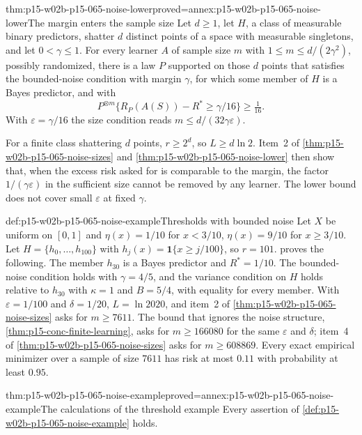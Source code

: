 \begin{hbcorollary}{thm:p15-w02b-p15-065-noise-lower}{proved=annex:p15-w02b-p15-065-noise-lower}{The margin enters the sample size}
Let \(d\geq1\), let \(H\), a class of measurable binary predictors,
shatter \(d\) distinct points of a space with measurable singletons, and
let \(0<\gamma\leq1\). For every learner \(A\)
of sample size \(m\) with \(1\leq m\leq d/(2\gamma^2)\), possibly
randomized, there is a law \(P\) supported on those \(d\) points that
satisfies the bounded-noise condition with margin \(\gamma\), for which
some member of \(H\) is a Bayes predictor, and with
\[
 P^{\otimes m}\{R_P(A(S))-R^{*}\geq\gamma/16\}\geq\tfrac1{16}.
\]
With \(\varepsilon=\gamma/16\) the size condition reads
\(m\leq d/(32\gamma\varepsilon)\).
\end{hbcorollary}

For a finite class shattering \(d\) points, \(r\geq2^d\), so
\(L\geq d\ln2\). Item~2 of \cref{thm:p15-w02b-p15-065-noise-sizes} and
\cref{thm:p15-w02b-p15-065-noise-lower} then show that, when the excess
risk asked for is comparable to the margin, the factor
\(1/(\gamma\varepsilon)\) in the sufficient size cannot be removed by any
learner. The lower bound does not cover small \(\varepsilon\) at fixed
\(\gamma\).

\begin{hbexample}{def:p15-w02b-p15-065-noise-example}{Thresholds with bounded noise}
Let \(X\) be uniform on \([0,1]\) and \(\eta(x)=1/10\) for \(x<3/10\),
\(\eta(x)=9/10\) for \(x\geq3/10\). Let \(H=\{h_0,\ldots,h_{100}\}\) with
\(h_j(x)=\mathbf1\{x\geq j/100\}\), so \(r=101\).
 proves the following. The member
\(h_{30}\) is a Bayes predictor and \(R^{*}=1/10\). The bounded-noise
condition holds with \(\gamma=4/5\), and the variance condition on \(H\)
holds relative to \(h_{30}\) with \(\kappa=1\) and \(B=5/4\), with equality
for every member. With \(\varepsilon=1/100\) and \(\delta=1/20\),
\(L=\ln2020\), and item~2 of \cref{thm:p15-w02b-p15-065-noise-sizes}
asks for \(m\geq7611\). The bound that ignores the noise structure,
\cref{thm:p15-conc-finite-learning}, asks for \(m\geq166080\) for the same
\(\varepsilon\) and \(\delta\); item~4 of
\cref{thm:p15-w02b-p15-065-noise-sizes} asks for \(m\geq608869\). Every
exact empirical minimizer over a sample of size \(7611\) has risk at most
\(0.11\) with probability at least \(0.95\).
\end{hbexample}

\begin{hbtheorem}{thm:p15-w02b-p15-065-noise-example}{proved=annex:p15-w02b-p15-065-noise-example}{The calculations of the threshold example}
Every assertion of \cref{def:p15-w02b-p15-065-noise-example} holds.
\end{hbtheorem}


